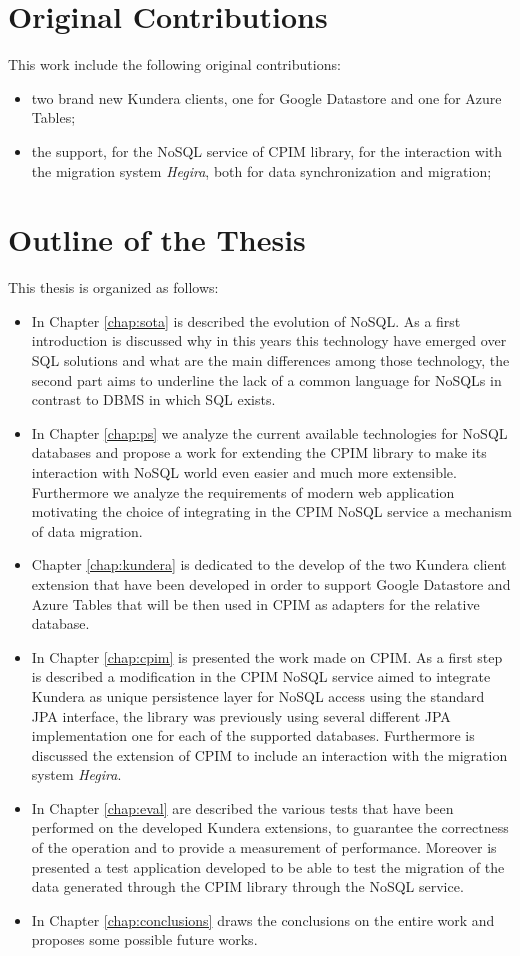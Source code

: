 \section*{Original Contributions}
This work include the following original contributions:
\begin{itemize}
\item two brand new Kundera clients, one for Google Datastore and one for Azure Tables;
\item the support, for the  NoSQL service of CPIM library, for the interaction with the migration system \textit{Hegira}, both for data synchronization and migration; 
\end{itemize}

\section*{Outline of the Thesis}
This thesis is organized as follows: 
\begin{itemize}
\item In Chapter \ref{chap:sota} is described the evolution of NoSQL. As a first introduction is discussed why in this years this technology have emerged over SQL solutions and what are the main differences among those technology, the second part aims to underline the lack of a common language for NoSQLs in contrast to DBMS in which SQL exists.
\item In Chapter \ref{chap:ps} we analyze the current available technologies for NoSQL databases and propose a work for extending the CPIM library to make its interaction with NoSQL world even easier and much more extensible. Furthermore we analyze the requirements of modern web application motivating the choice of integrating in the CPIM NoSQL service a mechanism of data migration.
\item Chapter \ref{chap:kundera} is dedicated to the develop of the two Kundera client extension that have been developed in order to support Google Datastore and Azure Tables that will be then used in CPIM as adapters for the relative database.
\item In Chapter \ref{chap:cpim} is presented the work made on CPIM. As a first step is described a modification in the CPIM NoSQL service aimed to integrate Kundera as unique persistence layer for NoSQL access using the standard JPA interface, the library was previously using several different JPA implementation one for each of the supported databases. Furthermore is discussed the extension of CPIM to include an interaction with the migration system \textit{Hegira}.
\item In Chapter \ref{chap:eval} are described the various tests that have been performed on the developed Kundera extensions, to guarantee the correctness of the operation and to provide a measurement of performance. Moreover is presented a test application developed to be able to test the migration of the data generated through the CPIM library through the NoSQL service.
\item In Chapter \ref{chap:conclusions} draws the conclusions on the entire work and proposes some possible future works.
\end{itemize}

